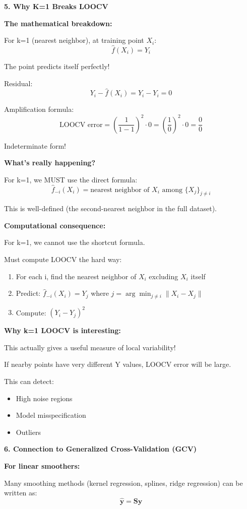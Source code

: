 \documentclass[12pt]{article}
\begin{document}
\begin{explanation}
\textbf{5. Why K=1 Breaks LOOCV}

\textbf{The mathematical breakdown:}

For k=1 (nearest neighbor), at training point $X_i$:
\[
\hat{f}(X_i) = Y_i
\]

The point predicts itself perfectly!

Residual:
\[
Y_i - \hat{f}(X_i) = Y_i - Y_i = 0
\]

Amplification formula:
\[
\text{LOOCV error} = \left(\frac{1}{1-1}\right)^2 \cdot 0 = \left(\frac{1}{0}\right)^2 \cdot 0 = \frac{0}{0}
\]

Indeterminate form!

\textbf{What's really happening?}

For k=1, we MUST use the direct formula:
\[
\hat{f}_{-i}(X_i) = \text{nearest neighbor of } X_i \text{ among } \{X_j\}_{j \neq i}
\]

This is well-defined (the second-nearest neighbor in the full dataset).

\textbf{Computational consequence:}

For k=1, we cannot use the shortcut formula.

Must compute LOOCV the hard way:
\begin{enumerate}
    \item For each i, find the nearest neighbor of $X_i$ excluding $X_i$ itself
    \item Predict: $\hat{f}_{-i}(X_i) = Y_j$ where $j = \arg\min_{j \neq i} \|X_i - X_j\|$
    \item Compute: $(Y_i - Y_j)^2$
\end{enumerate}

\textbf{Why k=1 LOOCV is interesting:}

This actually gives a useful measure of local variability!

If nearby points have very different Y values, LOOCV error will be large.

This can detect:
\begin{itemize}
    \item High noise regions
    \item Model misspecification
    \item Outliers
\end{itemize}

\textbf{6. Connection to Generalized Cross-Validation (GCV)}

\textbf{For linear smoothers:}

Many smoothing methods (kernel regression, splines, ridge regression) can be written as:
\[
\hat{\mathbf{y}} = \mathbf{S}\mathbf{y}
\]


\end{explanation}
\end{document}
